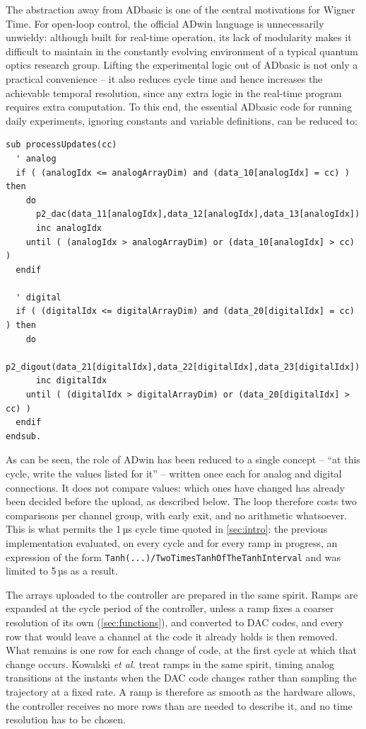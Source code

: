 \documentclass{SciPost}
\newcommand{\python}[1]{%
  \texttt{#1}%
}
\begin{document}
The abstraction away from ADbasic is one of the central motivations for Wigner Time. For open-loop control, the official ADwin language is unnecessarily unwieldy: although built for real-time operation, its lack of modularity makes it difficult to maintain in the constantly evolving environment of a typical quantum optics research group. Lifting the experimental logic out of ADbasic is not only a practical convenience – it also reduces cycle time and hence increases the achievable temporal resolution, since any extra logic in the real-time program requires extra computation. To this end, the essential ADbasic code for running daily experiments, ignoring constants and variable definitions, can be reduced to:
\begin{verbatim}
sub processUpdates(cc)
  ' analog
  if ( (analogIdx <= analogArrayDim) and (data_10[analogIdx] = cc) ) then
    do  
      p2_dac(data_11[analogIdx],data_12[analogIdx],data_13[analogIdx])
      inc analogIdx
    until ( (analogIdx > analogArrayDim) or (data_10[analogIdx] > cc) )
  endif
  
  ' digital
  if ( (digitalIdx <= digitalArrayDim) and (data_20[digitalIdx] = cc) ) then
    do
      p2_digout(data_21[digitalIdx],data_22[digitalIdx],data_23[digitalIdx])
      inc digitalIdx
    until ( (digitalIdx > digitalArrayDim) or (data_20[digitalIdx] > cc) )
  endif
endsub.
\end{verbatim}
 
As can be seen, the role of ADwin has been reduced to a single concept – “at this
cycle, write the values listed for it” – written once each for analog and digital
connections. It does not compare values: which ones have changed has already been
decided before the upload, as described below. The
loop therefore costs two comparisons per channel group, with early exit, and no
arithmetic whatsoever. This is what permits the 1\,µs cycle time quoted in
\cref{sec:intro}: the previous implementation evaluated, on every cycle and for
every ramp in progress, an expression of the form
\python{Tanh(...)/TwoTimesTanhOfTheTanhInterval} and was limited to 5\,µs as a result.

The arrays uploaded to the controller are prepared in the same spirit. Ramps are expanded at the cycle period of the controller, unless a ramp fixes a coarser resolution of its own (\cref{sec:functions}), and converted to DAC codes, and every row that would leave a channel at the code it already holds is then removed. What remains is one row for each change of code, at the first cycle at which that change occurs. Kowalski \textit{et al.} \cite{kowalski2023entangleware} treat ramps in the same spirit, timing analog transitions at the instants when the DAC code changes rather than sampling the trajectory at a fixed rate. A ramp is therefore as smooth as the hardware allows, the controller receives no more rows than are needed to describe it, and no time resolution has to be chosen.
\end{document}
